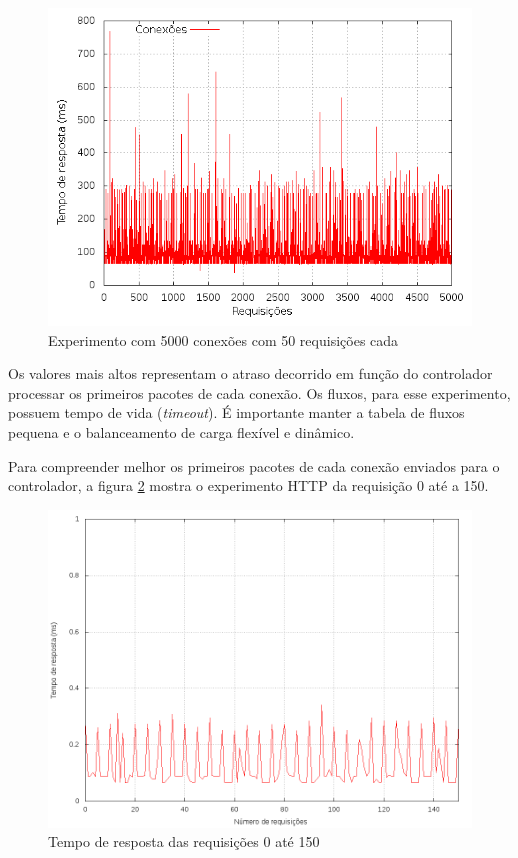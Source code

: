 \begin{figure}[htb!]
    \centering
    \includegraphics[scale=0.5]{img/balancer-http-full}
    \caption{Experimento com 5000 conexões com 50 requisições cada}
    \label{fig:balancer-http-full}
\end{figure}

Os valores mais altos representam o atraso decorrido em função do controlador
processar os primeiros pacotes de cada conexão.
Os fluxos, para esse experimento, possuem tempo de vida (\emph{timeout}).
É importante manter a tabela de fluxos pequena e o balanceamento de carga
flexível e dinâmico.

Para compreender melhor os primeiros pacotes de cada conexão enviados para 
o controlador, a figura \ref{fig:balancer-http-zoom} mostra o experimento 
HTTP da requisição 0 até a 150.

\begin{figure}[htb!]
    \centering
    \includegraphics[scale=0.4]{img/balancer-http-zoom}
    \caption{Tempo de resposta das requisições 0 até 150}
    \label{fig:balancer-http-zoom}
\end{figure}

